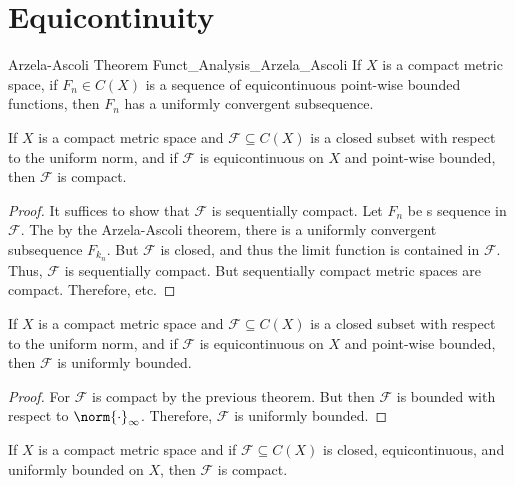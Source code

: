 \section{Equicontinuity}
    \begin{ltheorem}{Arzela-Ascoli Theorem}
          {Funct_Analysis_Arzela_Ascoli}
        If $X$ is a compact metric space, if
        $F_{n}\in{C}(X)$ is a sequence of equicontinuous
        point-wise bounded functions, then $F_{n}$ has a
        uniformly convergent subsequence.
    \end{ltheorem}
    \begin{theorem}
        If $X$ is a compact metric space and
        $\mathscr{F}\subseteq{C}(X)$ is a closed subset with
        respect to the uniform norm, and if
        $\mathscr{F}$ is equicontinuous on $X$ and point-wise
        bounded, then $\mathscr{F}$ is compact.
    \end{theorem}
    \begin{proof}
        It suffices to show that $\mathscr{F}$ is sequentially
        compact. Let $F_{n}$ be s sequence in $\mathscr{F}$.
        The by the Arzela-Ascoli theorem, there is a uniformly
        convergent subsequence $F_{k_{n}}$. But $\mathscr{F}$
        is closed, and thus the limit function is contained
        in $\mathscr{F}$. Thus, $\mathscr{F}$ is sequentially
        compact. But sequentially compact metric spaces are
        compact. Therefore, etc.
    \end{proof}
    \begin{theorem}
        If $X$ is a compact metric space and
        $\mathscr{F}\subseteq{C}(X)$ is a closed subset with
        respect to the uniform norm, and if
        $\mathscr{F}$ is equicontinuous on $X$ and point-wise
        bounded, then $\mathscr{F}$ is uniformly bounded.
    \end{theorem}
    \begin{proof}
        For $\mathscr{F}$ is compact by the previous theorem.
        But then $\mathscr{F}$ is bounded with respect to
        $\norm{\cdot}_{\infty}$. Therefore, $\mathscr{F}$ is
        uniformly bounded.
    \end{proof}
    \begin{theorem}
        If $X$ is a compact metric space and if
        $\mathscr{F}\subseteq{C}(X)$ is closed, equicontinuous,
        and uniformly bounded on $X$, then $\mathscr{F}$ is
        compact.
    \end{theorem}
